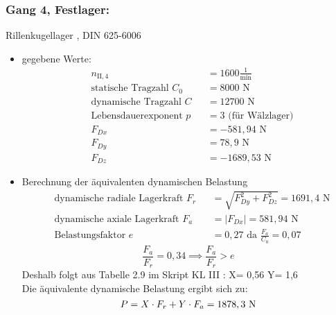\subsubsection{Gang 4, Festlager:} Rillenkugellager , DIN 625-6006\\
\begin{itemize}
	\item gegebene Werte:
	\begin{align*}
	&n_{{\mathord{\mathrm{II}},4}} &&=  1600 \frac{1}{\text{min}} \\
	&\text{statische Tragzahl } C_{0} &&= 8000 \text{ N}\\
	&\text{dynamische Tragzahl } C &&= 12700 \text{ N} \\
	&\text{Lebensdauerexponent } p &&= 3 \text{ (für Wälzlager)} \\
	&F_{Dx} && = -581,94 \text{ N}\\
	&F_{Dy} && = 78,9 \text{ N}\\
	&F_{Dz} && = -1689,53 \text{ N}
	\end{align*} 
	\item Berechnung der äquivalenten dynamischen Belastung
	\begin{align*}
	&\text{dynamische radiale Lagerkraft } F_r&& = \sqrt{F_{Dy}^2 + F_{Dz}^2 } =1691,4\text{ N} \\
	&\text{dynamische axiale Lagerkraft } F_a&& = |F_{Dx}| = 581,94 \text{ N}\\
	&\text{Belastungsfaktor } e &&= 0,27 \text{ da } \frac{F_a}{C_0} = 0,07
	\end{align*} 
	\[\frac{F_a}{F_r} = 0,34 \implies \frac{F_a}{F_r} > e\]
	Deshalb folgt aus Tabelle 2.9 im Skript KL III : X= 0,56 \text{, } Y= 1,6 \\
	Die äquivalente dynamische Belastung ergibt sich zu: 
	\[
	P= X \cdot F_r + Y \cdot F_a= 1878,3 \text{ N}
	\]
\end{itemize}
\newpage
